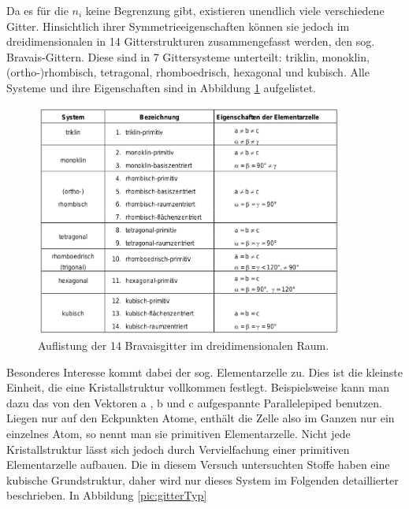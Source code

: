 Da es für die $n_i$ keine Begrenzung gibt, existieren unendlich viele verschiedene Gitter. Hinsichtlich ihrer Symmetrieeigenschaften können sie jedoch im dreidimensionalen in 14 Gitterstrukturen zusammengefasst werden, den sog. Bravais-Gittern. Diese sind in 7 Gittersysteme unterteilt: triklin, monoklin, (ortho-)rhombisch, tetragonal, rhomboedrisch, hexagonal und kubisch. Alle Systeme und ihre Eigenschaften sind in Abbildung \ref{pic:bravais} aufgelistet.
\begin{figure}[htbp]
	\includegraphics[width=0.9\textwidth]{../pics/bravais.png}
	\caption{Auflistung der 14 Bravaisgitter im dreidimensionalen Raum.}
	\label{pic:bravais}
\end{figure}

Besonderes Interesse  kommt dabei der sog. Elementarzelle zu. Dies ist die kleinste Einheit, die eine Kristallstruktur vollkommen festlegt. Beispielsweise kann man dazu das von den Vektoren a , b und c aufgespannte Parallelepiped benutzen. Liegen nur auf den Eckpunkten Atome, enthält die Zelle also im Ganzen nur ein einzelnes Atom, so nennt man sie primitiven Elementarzelle. 
Nicht jede Kristallstruktur lässt sich jedoch durch Vervielfachung einer primitiven Elementarzelle aufbauen. Die in diesem Versuch untersuchten Stoffe haben eine kubische Grundstruktur, daher wird nur dieses System im Folgenden detaillierter beschrieben. In Abbildung \ref{pic:gitterTyp}

